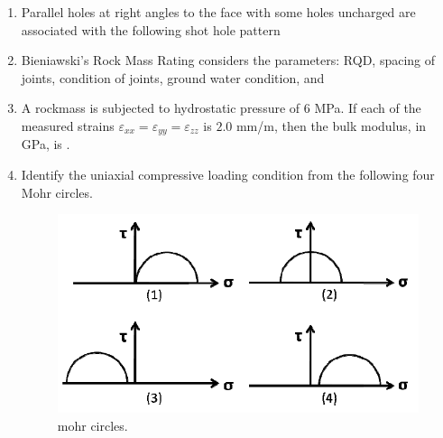 \documentclass[journal]{IEEEtran}
\begin{document}
\begin{enumerate}
\item Parallel holes at right angles to the face with some holes uncharged are associated with the following shot hole pattern
\vspace{-\baselineskip} 
  \begin{enumerate}
  \end{enumerate}
  \vspace{-\baselineskip} 
  \hfill{}
\item Bieniawski’s Rock Mass Rating considers the parameters: RQD, spacing of joints, condition of joints, ground water condition, and
\vspace{-\baselineskip} 
  \begin{enumerate}
  \end{enumerate}
  \vspace{-\baselineskip} 
  \hfill{}

\item A rockmass is subjected to hydrostatic pressure of $6$ MPa. If each of the measured strains 
$\varepsilon_{xx} = \varepsilon_{yy} = \varepsilon_{zz}$ is $2.0$ mm/m, then the bulk modulus, in GPa, is \underline{\hspace{1.5cm}}.
\begin{flushright}
{}
\end{flushright}

\item Identify the uniaxial compressive loading condition from the following four Mohr circles.
\begin{figure}[h!]
    \centering
    \includegraphics[width=0.7\linewidth]{figs/mohr_circles.png}
    \caption{mohr circles.}
    \label{fig:mohr_circles}
\end{figure}


\end{enumerate}
\end{document}
